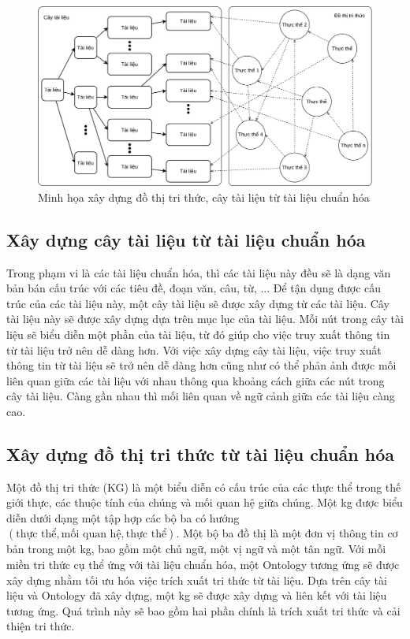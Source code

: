 \begin{figure}
    \centering
    \includegraphics[width=1\textwidth]{Chapter3/Fig/database_construction.png}
    \caption{Minh họa xây dựng đồ thị tri thức, cây tài liệu từ tài liệu chuẩn hóa}
    \label{fig:kg_construction}
\end{figure}
\subsection{Xây dựng cây tài liệu từ tài liệu chuẩn hóa}
\label{subsection:document_tree_construction}
Trong phạm vi là các tài liệu chuẩn hóa, thì các tài liệu này đều sẽ là dạng văn bản bán cấu trúc với các tiêu đề, đoạn văn, câu, từ, ... Để tận dụng được cấu trúc của các tài liệu này, một cây tài liệu sẽ được xây dựng từ các tài liệu. Cây tài liệu này sẽ được xây dựng dựa trên mục lục của tài liệu. Mỗi nút trong cây tài liệu sẽ biểu diễn một phần của tài liệu, từ đó giúp cho việc truy xuất thông tin từ tài liệu trở nên dễ dàng hơn. Với việc xây dựng cây tài liệu, việc truy xuất thông tin từ tài liệu sẽ trở nên dễ dàng hơn cũng như có thể phản ảnh được mối liên quan giữa các tài liệu với nhau thông qua khoảng cách giữa các nút trong cây tài liệu. Càng gần nhau thì mối liên quan về ngữ cảnh giữa các tài liệu càng cao.




\subsection{Xây dựng đồ thị tri thức từ tài liệu chuẩn hóa}
\label{subsection:knowledge_graph_construction_from_document}
Một đồ thị tri thức (KG) là một biểu diễn có cấu trúc của các thực thể trong thế giới thực, các thuộc tính của chúng và mối quan hệ giữa chúng. Một \gls{kg} được biểu diễn dưới dạng một tập hợp các bộ ba có hướng \((\text{thực thể}, \text{mối quan hệ}, \text{thực thể})\).  Một bộ ba đồ thị là một đơn vị thông tin cơ bản trong một \gls{kg}, bao gồm một chủ ngữ, một vị ngữ và một tân ngữ.
Với mỗi miền tri thức cụ thể ứng với tài liệu chuẩn hóa, một Ontology tương ứng sẽ được xây dựng nhằm tối ưu hóa việc trích xuất tri thức từ tài liệu. Dựa trên cây tài liệu và Ontology đã xây dựng, một \gls{kg} sẽ được xây dựng và liên kết với tài liệu tương ứng. Quá trình này sẽ bao gồm hai phần chính là trích xuất tri thức và cải thiện tri thức.


